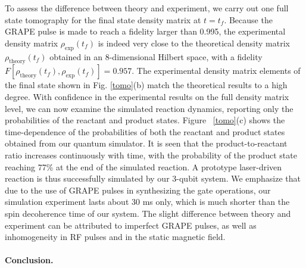 \documentclass[prl,twocolumn,showpacs]{revtex4}
\begin{document}
 To assess the difference between theory and experiment,  we carry out one full state tomography for the final state density matrix  at $t=t_f$.
 Because the GRAPE pulse is made to reach a fidelity larger than 0.995, the experimental density matrix $\rho_{\text{exp}}(t_f)$
 is indeed very close to the  theoretical density matrix $\rho_{\text{theory}}(t_f)$ obtained in an 8-dimensional Hilbert space, with a fidelity $F[\rho_{\text{theory}}(t_f),\rho_{\text{exp}}(t_f)]=0.957$. The experimental density matrix elements of the final state shown in Fig. \ref{tomo}(b) match the theoretical results to a high degree. With confidence in the experimental results on the full density matrix level, we can now examine the simulated reaction dynamics, reporting only the probabilities of the reactant and product states.
 Figure~ \ref{tomo}(c) shows the time-dependence of the probabilities of both the reactant and product states obtained from our quantum simulator.
 It is seen that the product-to-reactant ratio
  increases continuously with time, with the probability of the product state reaching 77\% at the end of the simulated reaction.
    A prototype laser-driven reaction is thus successfully simulated by our 3-qubit system.
    We emphasize that due to the use of GRAPE pulses in synthesizing the gate operations, our simulation experiment lasts about 30 ms only, which is much shorter than the spin decoherence time of our system.
  The slight difference between theory and experiment can be attributed to imperfect GRAPE pulses, as well as inhomogeneity in RF pulses and in the static magnetic field.

\paragraph*{Conclusion.}
\end{document}
